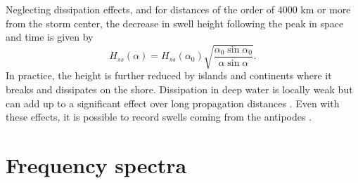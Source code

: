 Neglecting dissipation effects, and for distances of the order of 4000 km or more from the storm center, 
the decrease in swell height following the peak in space and time is given by 
\begin{equation}
H_{ss} (\alpha) = H_{ss} (\alpha_0)  \sqrt{\frac{\alpha_0  \sin \alpha_0}{\alpha \sin \alpha}}.
\label{swell_asymptote}
\end{equation}
In practice, the height is further reduced by islands and continents 
where it breaks and dissipates on the shore. Dissipation in deep water is locally weak but can add up to a significant effect 
over long propagation distances \citep{Ardhuin&al.2009b}. Even with these effects, it is possible to record swells coming from the 
antipodes \citep[e.g.][]{Munk&al.1963}. 
 

\section{Frequency spectra}
